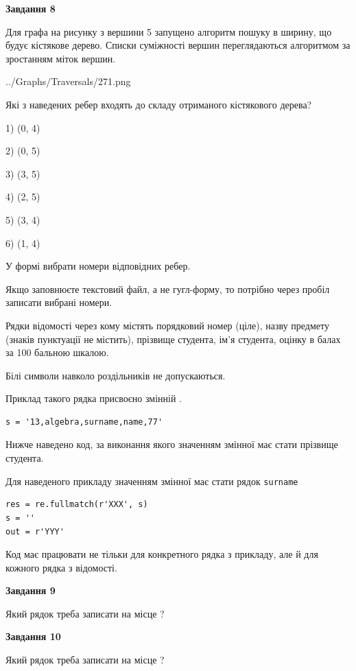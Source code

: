 \documentclass[12pt, ukrainian]{article}
\def\code#1{\Verb!#1!}
\begin{document}
{\begin {large}
{\begin {center}\textbf{Завдання 8}\end {center}}\par
Для графа на рисунку з вершини 5 запущено алгоритм пошуку в ширину, що будує кістякове дерево. Списки суміжності вершин переглядаються алгоритмом за зростанням міток вершин.\par
\begin{center}
	{../Graphs/Traversals/271.png}
\end{center}
\par Які з наведених ребер входять до складу отриманого кістякового дерева?\par
1) (0, 4)\par
2) (0, 5)\par
3) (3, 5)\par
4) (2, 5)\par
5) (3, 4)\par
6) (1, 4)\par
{\vskip 15pt} У формі вибрати номери відповідних ребер.


Якщо заповнюєте текстовий файл, а не гугл-форму, то потрібно через пробіл записа\-ти вибрані номери.\par
\newpage


Рядки відомості через кому містять порядковий номер (ціле), назву предмету (зна\-ків пунктуації не містить), прізвище студента, ім'я студента, оцінку в балах за 100 бальною шкалою.

Білі символи навколо роздільників не допускаються.

Приклад такого рядка присвоєно змінній .



\begin{verbatim}
s = '13,algebra,surname,name,77'
\end{verbatim}


Нижче наведено код, за виконання якого значенням змінної  має стати прізвище студента.

Для наведеного прикладу значенням змінної  має стати рядок \code{surname}



\begin{verbatim}
res = re.fullmatch(r'XXX', s)
s = ''
out = r'YYY'
\end{verbatim}


Код має працювати не тільки для конкретного рядка з прикладу, але й для кожного рядка з відомості.

{\begin {center}\textbf{Завдання 9}\end {center}}\par
Який рядок треба записати на місце  ?\par
\vspace{5mm}


{\begin {center}\textbf{Завдання 10}\end {center}}\par
Який рядок треба записати на місце  ?\par


\newpage


\end {large}}
\end{document}
